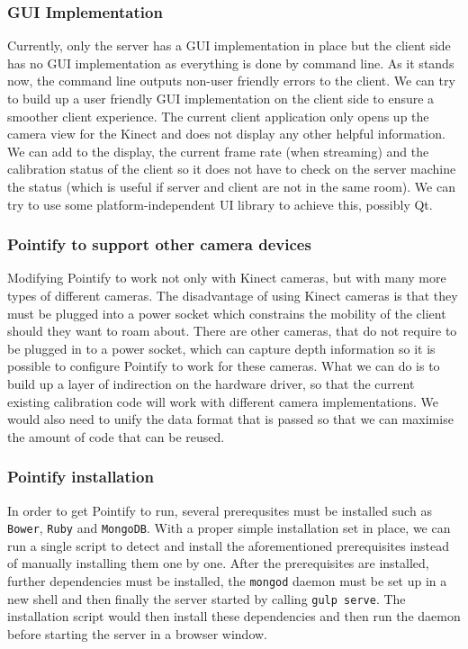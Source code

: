 \documentclass{article}
\begin{document}
\subsubsection{GUI Implementation}
Currently, only the server has a GUI implementation in place but the client side has no GUI implementation as everything is done by command line. As it stands now, the command line outputs non-user friendly errors to the client. We can try to build up a user friendly GUI implementation on the client side to ensure a smoother client experience. The current client application only opens up the camera view for the Kinect and does not display any other helpful information. We can add to the display, the current frame rate (when streaming) and the calibration status of the client so it does not have to check on the server machine the status (which is useful if server and client are not in the same room). We can try to use some platform-independent UI library to achieve this, possibly Qt.
\subsubsection{Pointify to support other camera devices}
Modifying Pointify to work not only with Kinect cameras, but with many more types of different cameras. The disadvantage of using Kinect cameras is that they must be plugged into a power socket which constrains the mobility of the client should they want to roam about. There are other cameras, that do not require to be plugged in to a power socket, which can capture depth information so it is possible to configure Pointify to work for these cameras. What we can do is to build up a layer of indirection on the hardware driver, so that the current existing calibration code will work with different camera implementations. We would also need to unify the data format that is passed so that we can maximise the amount of code that can be reused.
\subsubsection{Pointify installation}
In order to get Pointify to run, several prerequsites must be installed such as \texttt{Bower}, \texttt{Ruby} and \texttt{MongoDB}. With a proper simple installation set in place, we can run a single script to detect and install the aforementioned prerequisites instead of manually installing them one by one. After the prerequisites are installed, further dependencies must be installed, the \texttt{mongod} daemon must be set up in a new shell and then finally the server started by calling \texttt{gulp serve}. The installation script would then install these dependencies and then run the daemon before starting the server in a browser window.
\end{document}
